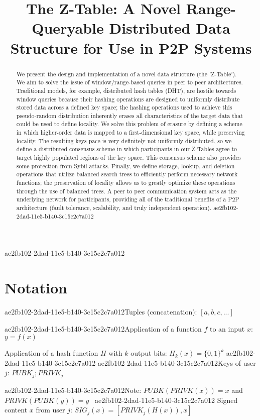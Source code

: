 \documentclass[12pt]{article}
\title{The Z-Table: A Novel Range-Queryable Distributed Data Structure for Use in P2P Systems}
\begin{document}
\maketitle
ae2fb102-2dad-11e5-b140-3c15c2c7a012
\begin{abstract}
We present the design and implementation of a novel data structure (the 'Z-Table'). We aim to solve the issue of window/range-based queries in peer to peer architectures. Traditional models, for example,  distributed hash tables (DHT), are hostile towards window queries because their hashing operations are designed to uniformly distribute stored data across a defined key space; the hashing operations used to achieve this pseudo-random distribution inherently erases all characteristics of the target data that could be used to define locality. We solve this problem of erasure by defining a scheme in which higher-order data is mapped to a first-dimensional key space, while preserving locality. The resulting keys pace is very definitely not uniformly distributed, so we define a distributed consensus scheme in which participants in our Z-Tables agree to target highly populated regions of the key space. This consensus scheme also provides some protection from Sybil attacks. Finally, we define storage, lookup, and deletion operations that utilize balanced search trees to efficiently perform necessary network functions; the preservation of locality allows us to greatly optimize these operations through the use of balanced trees. A peer to peer communication system acts as the underlying network for participants, providing all of the traditional benefits of a P2P architecture (fault tolerance, scalability, and truly independent operation).
ae2fb102-2dad-11e5-b140-3c15c2c7a012\end{abstract}

\section{Notation}

ae2fb102-2dad-11e5-b140-3c15c2c7a012Tuples (concatenation): $[a,b,c,...]$

ae2fb102-2dad-11e5-b140-3c15c2c7a012Application of a function $f$ to an input $x$: $y=f(x)$

Application of a hash function $H$ with $k$ output bits: $H_{k}(x) = \{0,1\}^k$
ae2fb102-2dad-11e5-b140-3c15c2c7a012
ae2fb102-2dad-11e5-b140-3c15c2c7a012Keys of user $j$: $ PUBK_j; PRIVK_j $

ae2fb102-2dad-11e5-b140-3c15c2c7a012Note: $PUBK(PRIVK(x)) = x$ and $PRIVK(PUBK(y)) = y$~
ae2fb102-2dad-11e5-b140-3c15c2c7a012
Signed content $x$ from user $j$: $SIG_j(x) = \left[ PRIVK_j( H(x) ), x \right]$
\end{document}
